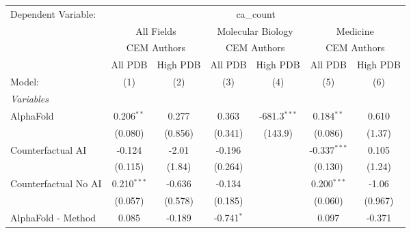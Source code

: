 \begingroup
\centering
\begin{tabular}{lcccccc}
   \tabularnewline \midrule \midrule
   Dependent Variable: & \multicolumn{6}{c}{ca\_count}\\
 & \multicolumn{2}{c}{All Fields} & \multicolumn{2}{c}{Molecular Biology} & \multicolumn{2}{c}{Medicine} \\
\cmidrule(lr){2-3} \cmidrule(lr){4-5} \cmidrule(lr){6-7}
 & \multicolumn{2}{c}{CEM Authors} & \multicolumn{2}{c}{CEM Authors} & \multicolumn{2}{c}{CEM Authors} \\
\cmidrule(lr){2-3} \cmidrule(lr){4-5} \cmidrule(lr){6-7}
 & \multicolumn{1}{c}{All PDB} & \multicolumn{1}{c}{High PDB} & \multicolumn{1}{c}{All PDB} & \multicolumn{1}{c}{High PDB} & \multicolumn{1}{c}{All PDB} & \multicolumn{1}{c}{High PDB} \\
\cmidrule(lr){2-2} \cmidrule(lr){3-3} \cmidrule(lr){4-4} \cmidrule(lr){5-5} \cmidrule(lr){6-6} \cmidrule(lr){7-7}
   Model:                                                     & (1)           & (2)           & (3)           & (4)            & (5)            & (6)\\  
   \midrule
   \emph{Variables}\\
   AlphaFold                                                  & 0.206$^{**}$  & 0.277         & 0.363         & -681.3$^{***}$ & 0.184$^{**}$   & 0.610\\   
                                                              & (0.080)       & (0.856)       & (0.341)       & (143.9)        & (0.086)        & (1.37)\\   
   Counterfactual AI                                          & -0.124        & -2.01         & -0.196        &                & -0.337$^{***}$ & 0.105\\   
                                                              & (0.115)       & (1.84)        & (0.264)       &                & (0.130)        & (1.24)\\   
   Counterfactual No AI                                       & 0.210$^{***}$ & -0.636        & -0.134        &                & 0.200$^{***}$  & -1.06\\   
                                                              & (0.057)       & (0.578)       & (0.185)       &                & (0.060)        & (0.967)\\   
   AlphaFold - Method                                         & 0.085         & -0.189        & -0.741$^{*}$  &                & 0.097          & -0.371\\   

\end{tabular}
